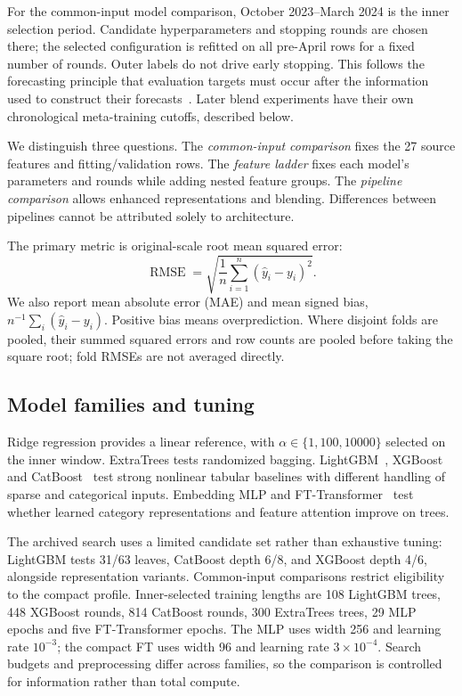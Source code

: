 \documentclass[conference]{IEEEtran}
\begin{document}
For the common-input model comparison, October 2023--March 2024 is the inner selection period. Candidate hyperparameters and stopping rounds are chosen there; the selected configuration is refitted on all pre-April rows for a fixed number of rounds. Outer labels do not drive early stopping. This follows the forecasting principle that evaluation targets must occur after the information used to construct their forecasts~\cite{forecasting}. Later blend experiments have their own chronological meta-training cutoffs, described below.

We distinguish three questions. The \emph{common-input comparison} fixes the 27 source features and fitting/validation rows. The \emph{feature ladder} fixes each model's parameters and rounds while adding nested feature groups. The \emph{pipeline comparison} allows enhanced representations and blending. Differences between pipelines cannot be attributed solely to architecture.

The primary metric is original-scale root mean squared error:
\begin{equation}
\operatorname{RMSE}=\sqrt{\frac{1}{n}\sum_{i=1}^{n}(\widehat y_i-y_i)^2}.
\end{equation}
We also report mean absolute error (MAE) and mean signed bias, $n^{-1}\sum_i(\widehat y_i-y_i)$. Positive bias means overprediction. Where disjoint folds are pooled, their summed squared errors and row counts are pooled before taking the square root; fold RMSEs are not averaged directly.

\subsection{Model families and tuning}
Ridge regression provides a linear reference, with $\alpha\in\{1,100,10000\}$ selected on the inner window. ExtraTrees tests randomized bagging. LightGBM~\cite{lightgbm}, XGBoost~\cite{xgboost} and CatBoost~\cite{catboost} test strong nonlinear tabular baselines with different handling of sparse and categorical inputs. Embedding MLP and FT-Transformer~\cite{ft} test whether learned category representations and feature attention improve on trees.

The archived search uses a limited candidate set rather than exhaustive tuning: LightGBM tests 31/63 leaves, CatBoost depth 6/8, and XGBoost depth 4/6, alongside representation variants. Common-input comparisons restrict eligibility to the compact profile. Inner-selected training lengths are 108 LightGBM trees, 448 XGBoost rounds, 814 CatBoost rounds, 300 ExtraTrees trees, 29 MLP epochs and five FT-Transformer epochs. The MLP uses width 256 and learning rate $10^{-3}$; the compact FT uses width 96 and learning rate $3\!\times\!10^{-4}$. Search budgets and preprocessing differ across families, so the comparison is controlled for information rather than total compute.
\end{document}
